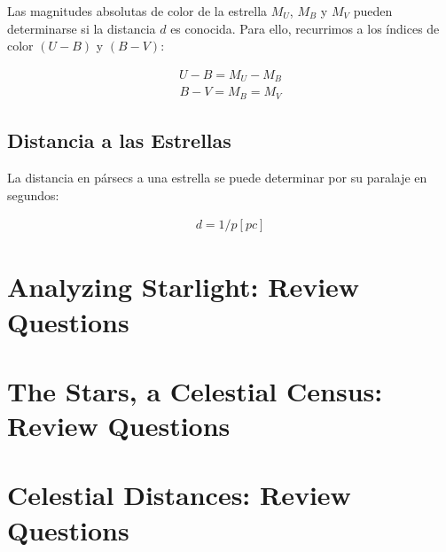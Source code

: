 \documentclass{tufte-handout}
\begin{document}
Las magnitudes absolutas de color de la estrella $M_U$, $M_B$ y $M_V$ pueden determinarse si la distancia $d$ es conocida. Para ello, recurrimos a los índices de color $(U-B)$ y $(B-V)$:

\begin{align}
  U - B = M_U - M_B
\end{align}
\begin{align}
  B - V = M_B = M_V
\end{align}


\subsection{Distancia a las Estrellas}

La distancia en pársecs a una estrella se puede determinar por su paralaje en segundos:

\begin{align}
  d = 1 / p [pc]
\end{align}

\clearpage

\section{Analyzing Starlight: Review Questions}

\clearpage

\section{The Stars, a Celestial Census: Review Questions}

\clearpage

\section{Celestial Distances: Review Questions}
\end{document}
